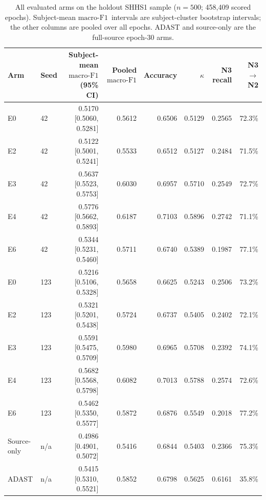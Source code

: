 \documentclass[10pt,a4paper]{article}
\newcommand{\mf}{\ensuremath{\mathrm{macro\text{-}F1}}}
\newcommand{\ci}{95\% CI}
\begin{document}
\begin{table}[H]
\centering\small
\caption{All evaluated arms on the holdout SHHS1 sample ($n=500$; 458{,}409 scored epochs).
Subject-mean \mf\ intervals are subject-cluster bootstrap intervals; the other columns are pooled over
all epochs. ADAST and source-only are the full-source epoch-30 arms.}
\label{tab:sup_holdout_arms}
\begin{tabular}{llrrrrrr}
\toprule
Arm & Seed & Subject-mean \mf\ (\ci) & Pooled \mf & Accuracy & $\kappa$ & N3 recall & N3$\to$N2 \\
\midrule
E0 & 42 & 0.5170 [0.5060, 0.5281] & 0.5612 & 0.6506 & 0.5129 & 0.2565 & 72.3\% \\
E2 & 42 & 0.5122 [0.5001, 0.5241] & 0.5533 & 0.6512 & 0.5127 & 0.2484 & 71.5\% \\
E3 & 42 & 0.5637 [0.5523, 0.5753] & 0.6030 & 0.6957 & 0.5710 & 0.2549 & 72.7\% \\
E4 & 42 & 0.5776 [0.5662, 0.5893] & 0.6187 & 0.7103 & 0.5896 & 0.2742 & 71.1\% \\
E6 & 42 & 0.5344 [0.5231, 0.5460] & 0.5711 & 0.6740 & 0.5389 & 0.1987 & 77.1\% \\
\addlinespace
E0 & 123 & 0.5216 [0.5106, 0.5328] & 0.5658 & 0.6625 & 0.5243 & 0.2506 & 73.2\% \\
E2 & 123 & 0.5321 [0.5201, 0.5438] & 0.5724 & 0.6737 & 0.5405 & 0.2402 & 72.1\% \\
E3 & 123 & 0.5591 [0.5475, 0.5709] & 0.5980 & 0.6965 & 0.5708 & 0.2392 & 74.1\% \\
E4 & 123 & 0.5682 [0.5568, 0.5798] & 0.6082 & 0.7013 & 0.5788 & 0.2574 & 72.6\% \\
E6 & 123 & 0.5462 [0.5350, 0.5577] & 0.5872 & 0.6876 & 0.5549 & 0.2018 & 77.2\% \\
\addlinespace
Source-only & n/a & 0.4986 [0.4901, 0.5072] & 0.5416 & 0.6844 & 0.5403 & 0.2366 & 75.3\% \\
ADAST & n/a & 0.5415 [0.5310, 0.5521] & 0.5852 & 0.6798 & 0.5625 & 0.6161 & 35.8\% \\
\bottomrule
\end{tabular}
\end{table}
\end{document}
